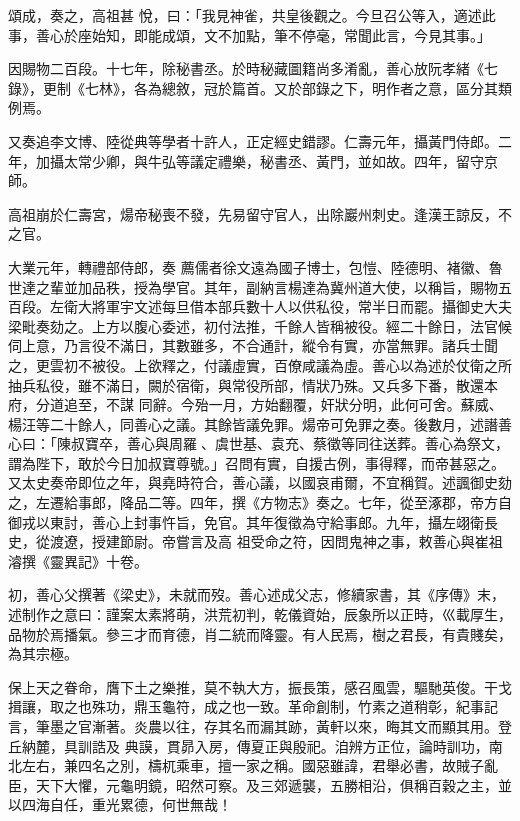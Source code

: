 \begin{pinyinscope}
 頌成，奏之，高祖甚
 悅，曰：「我見神雀，共皇後觀之。今旦召公等入，適述此事，善心於座始知，即能成頌，文不加點，筆不停毫，常聞此言，今見其事。」



 因賜物二百段。十七年，除秘書丞。於時秘藏圖籍尚多淆亂，善心放阮孝緒《七錄》，更制《七林》，各為總敘，冠於篇首。又於部錄之下，明作者之意，區分其類例焉。



 又奏追李文博、陸從典等學者十許人，正定經史錯謬。仁壽元年，攝黃門侍郎。二年，加攝太常少卿，與牛弘等議定禮樂，秘書丞、黃門，並如故。四年，留守京師。



 高祖崩於仁壽宮，煬帝秘喪不發，先易留守官人，出除巖州刺史。逢漢王諒反，不之官。



 大業元年，轉禮部侍郎，奏
 薦儒者徐文遠為國子博士，包愷、陸德明、褚徽、魯世達之輩並加品秩，授為學官。其年，副納言楊達為冀州道大使，以稱旨，賜物五百段。左衛大將軍宇文述每旦借本部兵數十人以供私役，常半日而罷。攝御史大夫梁毗奏劾之。上方以腹心委述，初付法推，千餘人皆稱被役。經二十餘日，法官候伺上意，乃言役不滿日，其數雖多，不合通計，縱令有實，亦當無罪。諸兵士聞之，更雲初不被役。上欲釋之，付議虛實，百僚咸議為虛。善心以為述於仗衛之所抽兵私役，雖不滿日，闕於宿衛，與常役所部，情狀乃殊。又兵多下番，散還本府，分道追至，不謀
 同辭。今殆一月，方始翻覆，奸狀分明，此何可舍。蘇威、楊汪等二十餘人，同善心之議。其餘皆議免罪。煬帝可免罪之奏。後數月，述譖善心曰：「陳叔寶卒，善心與周羅、虞世基、袁充、蔡徵等同往送葬。善心為祭文，謂為陛下，敢於今日加叔寶尊號。」召問有實，自援古例，事得釋，而帝甚惡之。又太史奏帝即位之年，與堯時符合，善心議，以國哀甫爾，不宜稱賀。述諷御史劾之，左遷給事郎，降品二等。四年，撰《方物志》奏之。七年，從至涿郡，帝方自御戎以東討，善心上封事忤旨，免官。其年復徵為守給事郎。九年，攝左翊衛長史，從渡遼，授建節尉。帝嘗言及高
 祖受命之符，因問鬼神之事，敕善心與崔祖濬撰《靈異記》十卷。



 初，善心父撰著《梁史》，未就而歿。善心述成父志，修續家書，其《序傳》末，述制作之意曰：謹案太素將萌，洪荒初判，乾儀資始，辰象所以正時，巛載厚生，品物於焉播氣。參三才而育德，肖二統而降靈。有人民焉，樹之君長，有貴賤矣，為其宗極。



 保上天之眷命，膺下土之樂推，莫不執大方，振長策，感召風雲，驅馳英俊。干戈揖讓，取之也殊功，鼎玉龜符，成之也一致。革命創制，竹素之道稍彰，紀事記言，筆墨之官漸著。炎農以往，存其名而漏其跡，黃軒以來，晦其文而顯其用。登丘納麓，具訓誥及
 典謨，貫昴入房，傳夏正與殷祀。洎辨方正位，論時訓功，南北左右，兼四名之別，檮杌乘車，擅一家之稱。國惡雖諱，君舉必書，故賊子亂臣，天下大懼，元龜明鏡，昭然可察。及三郊遞襲，五勝相沿，俱稱百穀之主，並以四海自任，重光累德，何世無哉！




\end{pinyinscope}
